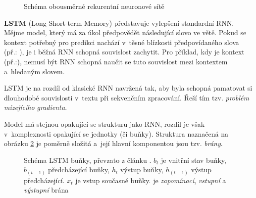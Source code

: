 \begin{figure}[hbt]
    \centering
	\caption{Schéma obousměrné rekurentní neuronové sítě}
	\label{bidirRNN}
\end{figure}

\pagebreak\textbf{LSTM} (Long Short-term Memory) představuje vylepšení standardní RNN. Mějme model, který má za úkol předpovědět následující slovo ve větě. Pokud se kontext potřebný pro predikci nachází v~těsné blízkosti předpovídaného slova (př.: ), je i běžná RNN schopná souvislost zachytit. Pro příklad, kdy je kontext  (př.:), nemusí být RNN schopná naučit se tuto souvislost mezi kontextem a~hledaným slovem.\par \smallskip
LSTM je  na rozdíl od klasické RNN navržená tak, aby byla schopná pamatovat si dlouhodobé souvislosti v~textu při sekvenčním zpracování. Řeší tím tzv. \emph{problém mizejícího gradientu}.\par
Model má stejnou opakující se strukturu jako RNN, rozdíl je však v~komplexnosti opakující se jednotky (či buňky). Struktura naznačená na obrázku \ref{lstm_cell} je poměrně složitá a~její hlavní komponentou jsou tzv. \emph{brány}. 

\begin{figure}[hbt]
    \centering
	\caption{Schéma LSTM buňky, převzato z článku \cite{understandingLSTM}. $b_t$ je vnitřní stav buňky, $b_{(t-1)}$ předcházející buňky, $h_t$ výstup buňky, $h_{(t-1)}$ výstup předcházející. $x_t$ je vstup současné buňky.  je \emph{zapomínací},  \emph{vstupní} a  \emph{výstupní} brána}
	\label{lstm_cell}
\end{figure}

